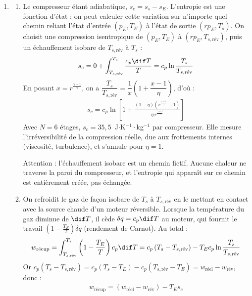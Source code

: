 \begin{correction}
\begin{enumerate}
	\item
	\begin{enumerate}
		\item Le compresseur étant adiabatique, $s_c=s_s-s_E$. L'entropie est une fonction d'état : on peut calculer cette variation sur n'importe quel chemin reliant l'état d'entrée $(p_E,T_E)$ à l'état de sortie $(rp_E,T_s)$. On choisit une compression isentropique de $(p_E,T_E)$ à $(rp_E,T_{s,\text{rév}})$, puis un échauffement isobare de $T_{s,\text{rév}}$ à $T_s$ :
		\begin{align*}
			s_c=0+\int_{T_{s,\text{rév}}}^{T_s}\frac{c_p\dif T}{T}=c_p\ln\frac{T_s}{T_{s,\text{rév}}}
		\end{align*}
		En posant $x=r^{\frac{\gamma-1}{\gamma}}$, on a $\dfrac{T_s}{T_{s,\text{rév}}}=\dfrac{1}{x}\left(1+\dfrac{x-1}{\eta}\right)$, d'où :
		\begin{align*}
			\boxed{s_c=c_p\ln\left[1+\frac{(1-\eta)\left(r^{\frac{\gamma-1}{\gamma}}-1\right)}{\eta\,r^{\frac{\gamma-1}{\gamma}}}\right]}
		\end{align*}
		Avec $N=6$ étages, $s_c=35{,}5$~J$\cdot$K$^{-1}\cdot$kg$^{-1}$ par compresseur. Elle mesure l'irréversibilité de la compression réelle, due aux frottements internes (viscosité, turbulence), et s'annule pour $\eta=1$.

		Attention : l'échauffement isobare est un chemin fictif. Aucune chaleur ne traverse la paroi du compresseur, et l'entropie qui apparaît sur ce chemin est entièrement créée, pas échangée.

		\item On refroidit le gaz de façon isobare de $T_s$ à $T_{s,\text{rév}}$ en le mettant en contact avec la source chaude d'un moteur réversible. Lorsque la température du gaz diminue de $\dif T$, il cède $\delta q=c_p\dif T$ au moteur, qui fournit le travail $\left(1-\frac{T_E}{T}\right)\delta q$ (rendement de Carnot). Au total :
		\begin{align*}
			w_{\text{récup}}=\int_{T_{s,\text{rév}}}^{T_s}\left(1-\frac{T_E}{T}\right)c_p\dif T=c_p\left(T_s-T_{s,\text{rév}}\right)-T_Ec_p\ln\frac{T_s}{T_{s,\text{rév}}}
		\end{align*}
		Or $c_p(T_s-T_{s,\text{rév}})=c_p(T_s-T_E)-c_p(T_{s,\text{rév}}-T_E)=w_{\text{réel}}-w_{\text{rév}}$, donc :
		\begin{align*}
			\boxed{w_{\text{récup}}=\left(w_{\text{réel}}-w_{\text{rév}}\right)-T_Es_c}
		\end{align*}


\end{enumerate}
\end{enumerate}
\end{correction}
